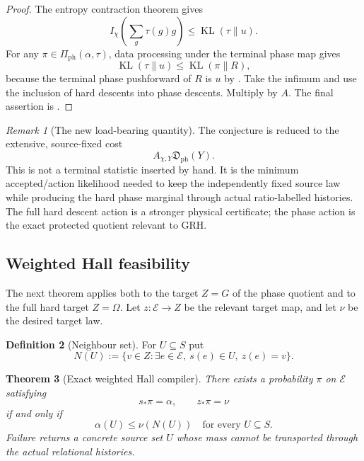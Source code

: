 \documentclass[11pt]{article}
\newtheorem{theorem}{Theorem}[section]
\theoremstyle{definition}
\newtheorem{definition}[theorem]{Definition}
\theoremstyle{remark}
\newtheorem{remark}[theorem]{Remark}
\newcommand{\KL}{\operatorname{KL}}
\newcommand{\Phase}{\mathrm{ph}}
\begin{document}
\begin{proof}
The entropy contraction theorem gives
\[
 I_\chi\!\left(\sum_g\tau(g)g\right)\le\KL(\tau\|u).
\]
For any $\pi\in\Pi_{\Phase}(\alpha,\tau)$, data processing under the terminal
phase map gives
\[
 \KL(\tau\|u)
 \le\KL(\pi\|R),
\]
because the terminal phase pushforward of $R$ is $u$ by
.  Take the infimum and use the inclusion of
hard descents into phase descents.  Multiply by $A$.  The final assertion is
.
\end{proof}

\begin{remark}[The new load-bearing quantity]
The conjecture is reduced to the extensive, source-fixed cost
\[
 \boxed{A_{\chi,Y}\mathfrak D_{\Phase}(Y).}
\]
This is not a terminal statistic inserted by hand.  It is the minimum
accepted/action likelihood needed to keep the independently fixed source law
while producing the hard phase marginal through actual ratio-labelled
histories.  The full hard descent action is a stronger physical certificate;
the phase action is the exact protected quotient relevant to GRH.
\end{remark}

\subsection{Weighted Hall feasibility}

The next theorem applies both to the target $Z=G$ of the phase quotient and to
the full hard target $Z=\Omega$.  Let $z:\mathcal E\to Z$ be the relevant
target map, and let $\nu$ be the desired target law.

\begin{definition}[Neighbour set]
For $U\subseteq S$ put
\[
 N(U):=\{v\in Z:\exists e\in\mathcal E,
          \ s(e)\in U,\ z(e)=v\}.
 \tag{4.7}
\]
\end{definition}

\begin{theorem}[Exact weighted Hall compiler]
\label{thm:weighted-Hall}
There exists a probability $\pi$ on $\mathcal E$ satisfying
\[
 s_*\pi=\alpha,
 \qquad
 z_*\pi=\nu
 \tag{4.8}
\]
if and only if
\[
 \boxed{\alpha(U)\le\nu(N(U))
 \quad\text{for every }U\subseteq S.}
 \tag{4.9}
\]
Failure returns a concrete source set $U$ whose mass cannot be transported
through the actual relational histories.
\end{theorem}
\end{document}
